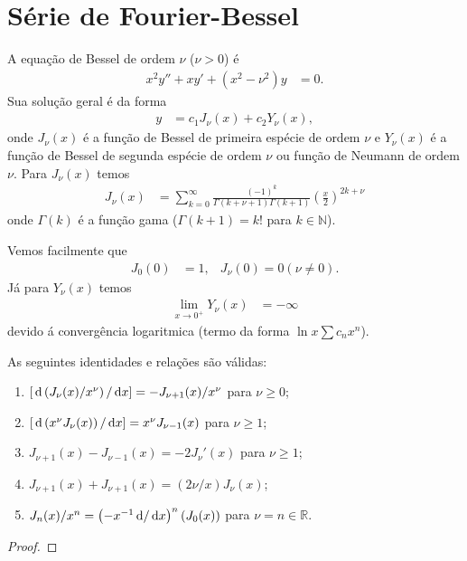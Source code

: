 \section{S\'{e}rie de Fourier-Bessel}
A equa\c{c}\~{a}o de Bessel de ordem $\nu$ ($\nu > 0$) \'{e}
\begin{align*}
    x^2 y'' + x y' + \left( x^2 - \nu^2 \right) y &= 0.
\end{align*}
Sua solu\c{c}\~{a}o geral \'{e} da forma
\begin{align*}
    y &= c_1 J_\nu(x) + c_2 Y_\nu(x),
\end{align*}
onde $J_\nu(x)$ \'{e} a fun\c{c}\~{a}o de Bessel de primeira esp\'{e}cie de ordem $\nu$ e $Y_\nu(x)$ \'{e} a fun\c{c}\~{a}o de Bessel de segunda esp\'{e}cie de ordem $\nu$ ou fun\c{c}\~{a}o de Neumann de ordem $\nu$. Para $J_\nu(x)$ temos
\begin{align*}
    J_\nu(x) &= \sum_{k = 0}^\infty \frac{(-1)^k}{\Gamma(k + \nu + 1) \Gamma(k + 1)} \left( \frac{x}{2} \right)^{2k + \nu}
\end{align*}
onde $\Gamma(k)$ \'{e} a fun\c{c}\~{a}o gama ($\Gamma(k + 1) = k!$ para $k \in \mathbb{N}$).

Vemos facilmente que
\begin{align*}
    J_0(0) &= 1, & J_\nu(0) = 0 (\nu \neq 0).
\end{align*}
J\'{a} para $Y_\nu(x)$ temos
\begin{align*}
    \lim_{x \to 0^+} Y_\nu(x) &= -\infty
\end{align*}
devido \'{a} converg\^{e}ncia logaritmica (termo da forma $\ln x \sum c_n x^n$).
\begin{prop}
    As seguintes identidades e rela\c{c}\~{o}es s\~{a}o v\'{a}lidas:
    \begin{enumerate}
        \item $\left[ \, \mathrm{d}\left( J_\nu(x) / x^\nu \right) / \, \mathrm{d}x \right] = - J_{\nu + 1}(x) / x^\nu$ para $\nu \geq 0$;
        \item $\left[ \, \mathrm{d}\left( x^\nu J_\nu(x) \right) / \, \mathrm{d}x \right] = x^\nu J_{\nu- 1}(x)$ para $\nu \geq 1$;
        \item $J_{\nu + 1}(x) - J_{\nu - 1}(x) = - 2 J_\nu'(x)$ para $\nu \geq 1$;
        \item $J_{\nu + 1}(x) + J_{\nu + 1}(x) = \left( 2 \nu / x \right) J_\nu(x)$;
        \item $J_n(x) / x^n = \left( -x^{-1} \, \mathrm{d} / \, \mathrm{d}x \right)^n \left( J_0(x) \right)$ para $\nu = n \in \mathbb{R}$.
    \end{enumerate}
\end{prop}
\begin{proof}
\end{proof}

